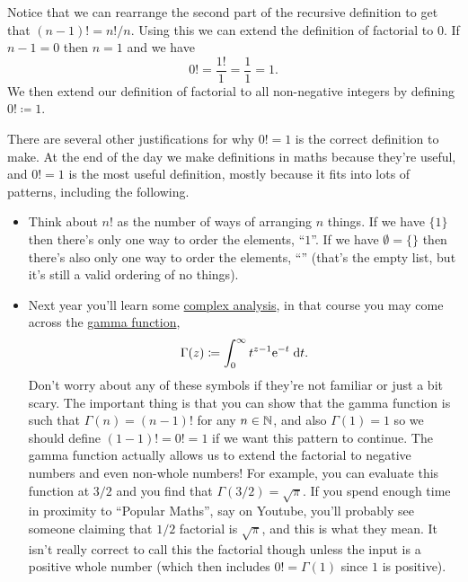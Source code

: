 \documentclass[fleqn]{LectureClass/LectureClass}
\begin{document}
    Notice that we can rearrange the second part of the recursive definition to get that \((n-1)! = n!/n\).
    Using this we can extend the definition of factorial to \(0\).
    If \(n - 1 = 0\) then \(n = 1\) and we have
    \begin{equation}
        0! = \frac{1!}{1} = \frac{1}{1} = 1.
    \end{equation}
    We then extend our definition of factorial to all non-negative integers by defining \(0! \coloneq 1\).
    
    \begin{remark}{}{}
        There are several other justifications for why \(0! = 1\) is the correct definition to make.
        At the end of the day we make definitions in maths because they're useful, and \(0! = 1\) is the most useful definition, mostly because it fits into lots of patterns, including the following.
        
        \begin{itemize}
            \item Think about \(n!\) as the number of ways of arranging \(n\) things.
            If we have \(\{1\}\) then there's only one way to order the elements, \enquote{\(1\)}.
            If we have \(\emptyset = \{\}\) then there's also only one way to order the elements, \enquote{\(\)} (that's the empty list, but it's still a valid ordering of no things).
        
            \item Next year you'll learn some \href{https://en.wikipedia.org/wiki/Complex_analysis}{complex analysis}, in that course you may come across the \href{https://en.wikipedia.org/wiki/Gamma_function}{gamma function},
            \begin{equation}
                \Gamma(z) \coloneq \int_0^{\infty} t^{z - 1} \e^{-t} \dd{t}.
            \end{equation}
            Don't worry about any of these symbols if they're not familiar or just a bit scary.
            The important thing is that you can show that the gamma function is such that \(\Gamma(n) = (n - 1)!\) for any \(n \in \mathbb{N}\), and also \(\Gamma(1) = 1\) so we should define \((1 - 1)! = 0! = 1\) if we want this pattern to continue.
            The gamma function actually allows us to extend the factorial to negative numbers and even non-whole numbers!
            For example, you can evaluate this function at \(3/2\) and you find that \(\Gamma(3/2) = \sqrt{\pi}\).
            If you spend enough time in proximity to \enquote{Popular Maths}, say on Youtube, you'll probably see someone claiming that \(1/2\) factorial is \(\sqrt{\pi}\), and this is what they mean.
            It isn't really correct to call this the factorial though unless the input is a positive whole number (which then includes \(0! = \Gamma(1)\) since \(1\) is positive).
        \end{itemize}
    \end{remark}
     
\end{document}
